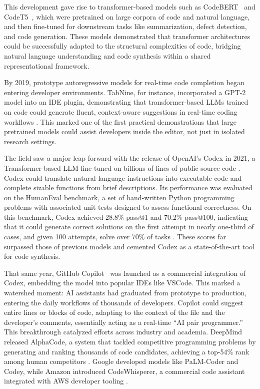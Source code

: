This development gave rise to transformer-based models such as CodeBERT~\autocite{Feng2020} and CodeT5~\autocite{wang2021codet5}, which were pretrained on large corpora of code and natural language, and then fine-tuned for downstream tasks like summarization, defect detection, and code generation. These models demonstrated that transformer architectures could be successfully adapted to the structural complexities of code, bridging natural language understanding and code synthesis within a shared representational framework.

By 2019, prototype autoregressive models for real-time code completion began entering developer environments. TabNine, for instance, incorporated a GPT-2 model into an \gls{IDE} plugin, demonstrating that transformer-based \glspl{LLM} trained on code could generate fluent, context-aware suggestions in real-time coding workflows \autocite{TabNineBlog2019}. This marked one of the first practical demonstrations that large pretrained models could assist developers inside the editor, not just in isolated research settings.

The field saw a major leap forward with the release of OpenAI’s Codex in 2021, a Transformer-based \gls{LLM} fine-tuned on billions of lines of public source code \autocite{Chen2021}. Codex could translate natural-language instructions into executable code and complete sizable functions from brief descriptions. Its performance was evaluated on the HumanEval benchmark, a set of hand-written Python programming problems with associated unit tests designed to assess functional correctness. On this benchmark, Codex achieved 28.8\% pass@1 and 70.2\% pass@100, indicating that it could generate correct solutions on the first attempt in nearly one-third of cases, and given 100 attempts, solve over 70\% of tasks \autocite{Chen2021,Austin2021}. These scores far surpassed those of previous models and cemented Codex as a state-of-the-art tool for code synthesis.

That same year, GitHub Copilot~\autocite{Github2021CopilotAnnouncement} was launched as a commercial integration of Codex, embedding the model into popular \glspl{IDE} like VSCode. This marked a watershed moment: \gls{AI} assistants had graduated from prototype to production, entering the daily workflows of thousands of developers. Copilot could suggest entire lines or blocks of code, adapting to the context of the file and the developer's comments, essentially acting as a real-time ``\gls{AI} pair programmer.'' This breakthrough catalyzed efforts across industry and academia. DeepMind released AlphaCode, a system that tackled competitive programming problems by generating and ranking thousands of code candidates, achieving a top-54\% rank among human competitors \autocite{Li2022}. Google developed models like PaLM-Coder and Codey, while Amazon introduced CodeWhisperer, a commercial code assistant integrated with AWS developer tooling \autocite{codewhisperer2023}.

